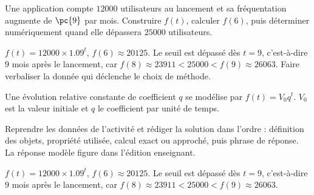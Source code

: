 \begin{activity}
Une application compte $\num{12000}$ utilisateurs au lancement et sa fréquentation augmente de $\pc{9}$ par mois. Construire $f(t)$, calculer $f(6)$, puis déterminer numériquement quand elle dépassera $\num{25000}$ utilisateurs.
\begin{center}\end{center}
\end{activity}
\begin{solution}$f(t)=\num{12000}\times\num{1,09}^t$, $f(6)\approx\num{20125}$. Le seuil est dépassé dès $t=9$, c'est-à-dire $9$ mois après le lancement, car $f(8)\approx\num{23911}<\num{25000}<f(9)\approx\num{26063}$. Faire verbaliser la donnée qui déclenche le choix de méthode.\end{solution}

\begin{summary}Une évolution relative constante de coefficient $q$ se modélise par $f(t)=V_0q^t$. $V_0$ est la valeur initiale et $q$ le coefficient par unité de temps.\end{summary}

\begin{example}
Reprendre les données de l'activité et rédiger la solution dans l'ordre : définition des objets, propriété utilisée, calcul exact ou approché, puis phrase de réponse. La réponse modèle figure dans l'édition enseignant.
\end{example}
\begin{solution}$f(t)=\num{12000}\times\num{1,09}^t$, $f(6)\approx\num{20125}$. Le seuil est dépassé dès $t=9$, c'est-à-dire $9$ mois après le lancement, car $f(8)\approx\num{23911}<\num{25000}<f(9)\approx\num{26063}$.\end{solution}

